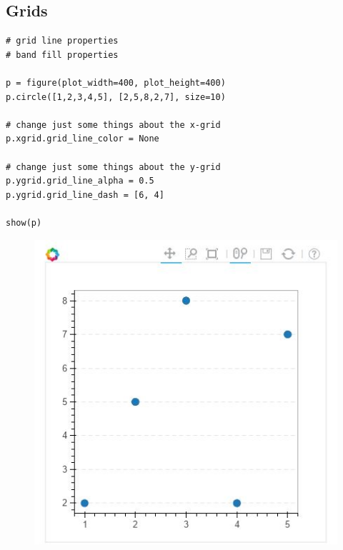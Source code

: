 \documentclass[a4paper,12pt]{article}
\begin{document}
\subsection{Grids}




\begin{framed}
\begin{verbatim}
# grid line properties
# band fill properties

p = figure(plot_width=400, plot_height=400)
p.circle([1,2,3,4,5], [2,5,8,2,7], size=10)

# change just some things about the x-grid
p.xgrid.grid_line_color = None

# change just some things about the y-grid
p.ygrid.grid_line_alpha = 0.5
p.ygrid.grid_line_dash = [6, 4]

show(p)
\end{verbatim}
\end{framed}
\begin{figure}[h!]
\centering
\includegraphics[width=0.7\linewidth]{images/04-grids-01}
\end{figure}
\end{document}

